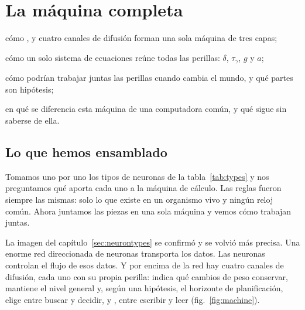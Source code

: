 \chapter{La máquina completa}
\label{sec:synthesis}
\begin{chaptergoals}
\item cómo ,  y cuatro canales de difusión forman una sola máquina de tres capas;
\item cómo un solo sistema de ecuaciones reúne todas las perillas: $\delta$, $\tau_\gamma$, $g$ y $a$;
\item cómo podrían trabajar juntas las perillas cuando cambia el mundo, y qué partes son hipótesis;
\item en qué se diferencia esta máquina de una computadora común, y qué sigue sin saberse de ella.
\end{chaptergoals}

\section{Lo que hemos ensamblado}

Tomamos uno por uno los tipos de neuronas de la tabla~\ref{tab:types} y nos preguntamos qué aporta cada uno a la máquina de cálculo. Las reglas fueron siempre las mismas: solo lo que existe en un organismo vivo y ningún reloj común. Ahora juntamos las piezas en una sola máquina y vemos cómo trabajan juntas.

La imagen del capítulo~\ref{sec:neurontypes} se confirmó y se volvió más precisa. Una enorme red direccionada de neuronas  transporta los datos. Las neuronas  controlan el flujo de esos datos. Y por encima de la red hay cuatro canales de difusión, cada uno con su propia perilla:  indica qué cambios de peso conservar,  mantiene el nivel general y, según una hipótesis, el horizonte de planificación,  elige entre buscar y decidir, y , entre escribir y leer (fig.~\ref{fig:machine}).

